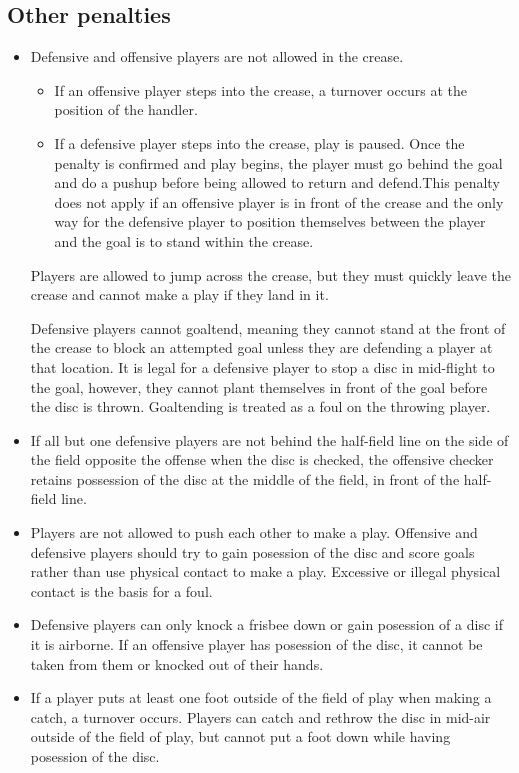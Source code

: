 \documentclass[10pt]{article}
\begin{document}
\subsection{Other penalties}
\begin{itemize}
    \item Defensive and offensive players are not allowed in the crease.
        \begin{itemize}
            \item If an offensive player steps into the crease, a turnover occurs at the position of the handler.
            \item If a defensive player steps into the crease, play is paused. Once the penalty is confirmed and play begins, the player must go behind the goal and do a pushup before being allowed to return and defend.\newline This penalty does not apply if an offensive player is in front of the crease and the only way for the defensive player to position themselves between the player and the goal is to stand within the crease.
        \end{itemize}
        Players are allowed to jump across the crease, but they must quickly leave the crease and cannot make a play if they land in it.

        Defensive players cannot goaltend, meaning they cannot stand at the front of the crease to block an attempted goal unless they are defending a player at that location. It is legal for a defensive player to stop a disc in mid-flight to the goal, however, they cannot plant themselves in front of the goal before the disc is thrown. Goaltending is treated as a foul on the throwing player.
    \item If all but one defensive players are not behind the half-field line on the side of the field opposite the offense when the disc is checked, the offensive checker retains possession of the disc at the middle of the field, in front of the half-field line.
    \item Players are not allowed to push each other to make a play. Offensive and defensive players should try to gain posession of the disc and score goals rather than use physical contact to make a play. Excessive or illegal physical contact is the basis for a foul.
    \item Defensive players can only knock a frisbee down or gain posession of a disc if it is airborne. If an offensive player has posession of the disc, it cannot be taken from them or knocked out of their hands.
    \item If a player puts at least one foot outside of the field of play when making a catch, a turnover occurs. Players can catch and rethrow the disc in mid-air outside of the field of play, but cannot put a foot down while having posession of the disc.
\end{itemize}
\end{document}
